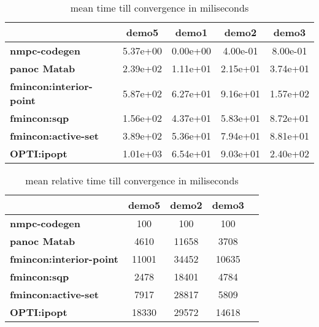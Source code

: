\begin{center}
	\begin{table}[H]
		\begin{tabular}{|l|c|c|c|c|}
			\hline
			&\textbf{demo5}&\textbf{demo1}&\textbf{demo2}&\textbf{demo3}\\\hline
			\textbf{nmpc-codegen}&5.37e+00&0.00e+00&4.00e-01&8.00e-01\\\hline
			\textbf{panoc Matab}&2.39e+02&1.11e+01&2.15e+01&3.74e+01\\\hline
			\textbf{fmincon:interior-point}&5.87e+02&6.27e+01&9.16e+01&1.57e+02\\\hline
			\textbf{fmincon:sqp}&1.56e+02&4.37e+01&5.83e+01&8.72e+01\\\hline
			\textbf{fmincon:active-set}&3.89e+02&5.36e+01&7.94e+01&8.81e+01\\\hline
			\textbf{OPTI:ipopt}&1.01e+03&6.54e+01&9.03e+01&2.40e+02\\\hline
		\end{tabular}
		\caption{mean time till convergence in miliseconds}
		\label{tbl:mean time till convergence}
	\end{table}
\end{center}

\begin{center}
	\begin{table}[H]
		\begin{tabular}{|l|c|c|c|c|}
			\hline
			&\textbf{demo5}&\textbf{demo2}&\textbf{demo3}\\\hline
			\textbf{nmpc-codegen}&100&100&100\\\hline
			\textbf{panoc Matab}&4610&11658&3708\\\hline
			\textbf{fmincon:interior-point}&11001&34452&10635\\\hline
			\textbf{fmincon:sqp}&2478&18401&4784\\\hline
			\textbf{fmincon:active-set}&7917&28817&5809\\\hline
			\textbf{OPTI:ipopt}&18330&29572&14618\\\hline
		\end{tabular}
		\caption{mean relative time till convergence in miliseconds}
		\label{tbl:mean relative time till convergence}
	\end{table}
\end{center}

